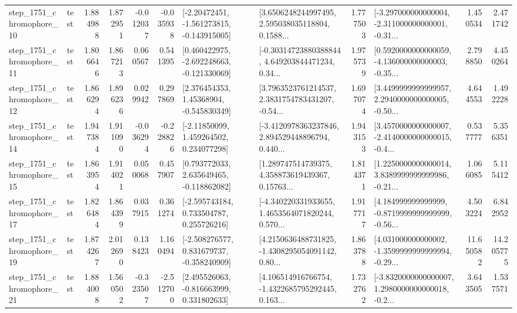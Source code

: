 \begin{tabular}{llrrrrllrlrr}
 step\_1751\_chromophore\_10 &      test &      1.884988 &    1.872951 &     -0.012037 & -0.035938 &   [-2.20472451, -1.561273815, -0.143915005] &  [3.6506248244997495, 2.595038035118804, 0.1588... &       1.777503 &  [-3.297000000000004, -2.311000000000001, -0.31... &            1.450534 &          2.471742 \\
 step\_1751\_chromophore\_11 &      test &      1.806646 &    1.867213 &      0.060567 &  0.541395 &   [0.460422975, -2.692248663, -0.121330069] &  [-0.30314723880388844, 4.649203844471234, 0.34... &       1.975739 &  [0.5920000000000059, -4.136000000000003, -0.35... &            2.798850 &          4.450264 \\
 step\_1751\_chromophore\_12 &      test &      1.866294 &    1.896236 &      0.029942 &  0.297869 &     [2.376454353, 1.45368904, -0.545830349] &  [3.7963523761214537, 2.3831754783431207, -0.54... &       1.697074 &  [3.4499999999999957, 2.2940000000000005, -0.50... &            4.644553 &          1.492228 \\
 step\_1751\_chromophore\_14 &      test &      1.947384 &    1.911090 &     -0.036294 & -0.228826 &     [-2.11850099, 1.459264502, 0.234077298] &  [-3.4120978363237846, 2.894529448896794, 0.440... &       1.943153 &  [3.4570000000000007, -2.4140000000000015, -0.4... &            0.537777 &          5.356351 \\
 step\_1751\_chromophore\_15 &      test &      1.863954 &    1.914021 &      0.050068 &  0.457907 &    [0.793772033, 2.635649465, -0.118862082] &  [1.289747514739375, 4.358873619439367, 0.15763... &       1.814371 &  [1.2250000000000014, 3.8389999999999986, -0.21... &            1.066085 &          5.115412 \\
 step\_1751\_chromophore\_17 &      test &      1.826484 &    1.864399 &      0.037915 &  0.361274 &    [-2.595743184, 0.733504787, 0.255726216] &  [-4.340220331933655, 1.4653564071820244, 0.570... &       1.917717 &  [4.184999999999999, -0.8719999999999999, -0.56... &            4.503224 &          6.842952 \\
 step\_1751\_chromophore\_19 &      test &      1.874267 &    2.012690 &      0.138423 &  1.160494 &   [-2.508276577, 0.831679737, -0.358240909] &  [4.2150636488731825, -1.4308295054091142, 0.80... &       1.863788 &  [4.031000000000002, -1.3599999999999994, -0.29... &           11.650582 &         14.205775 \\
 step\_1751\_chromophore\_21 &      test &      1.884008 &    1.560502 &     -0.323507 & -2.512700 &    [2.495526063, -0.816663999, 0.331802633] &  [4.106514916766754, -1.4322685795292445, 0.163... &       1.732762 &  [-3.8320000000000007, 1.2980000000000018, -0.2... &            3.643505 &          1.537571 \\

\end{tabular}
